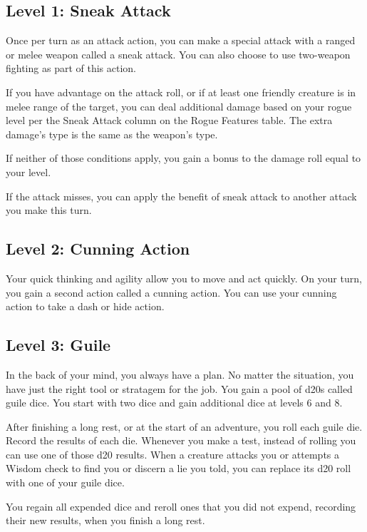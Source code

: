 \documentclass[12pt,letterpaper,twocolumn,openany,nodeprecatedcode,bg=none]{dndbook}
\begin{document}
\subsection{Level 1: Sneak Attack}\label{level-1-sneak-attack}

Once per turn as an attack action, you can make a special attack with a
ranged or melee weapon called a sneak attack. You can also choose to use
two-weapon fighting as part of this action.

If you have advantage on the attack roll, or if at least one friendly
creature is in melee range of the target, you can deal additional damage
based on your rogue level per the Sneak Attack column on the Rogue
Features table. The extra damage's type is the same as the weapon's
type.

If neither of those conditions apply, you gain a bonus to the damage
roll equal to your level.

If the attack misses, you can apply the benefit of sneak attack to
another attack you make this turn.

\subsection{Level 2: Cunning Action}\label{level-2-cunning-action}

Your quick thinking and agility allow you to move and act quickly. On
your turn, you gain a second action called a cunning action. You can use
your cunning action to take a dash or hide action.

\subsection{Level 3: Guile}\label{level-3-guile}

In the back of your mind, you always have a plan. No matter the
situation, you have just the right tool or stratagem for the job. You
gain a pool of d20s called guile dice. You start with two dice and gain
additional dice at levels 6 and 8.

After finishing a long rest, or at the start of an adventure, you roll
each guile die. Record the results of each die. Whenever you make a
test, instead of rolling you can use one of those d20 results. When a
creature attacks you or attempts a Wisdom check to find you or discern a
lie you told, you can replace its d20 roll with one of your guile dice.

You regain all expended dice and reroll ones that you did not expend,
recording their new results, when you finish a long rest.
\end{document}

